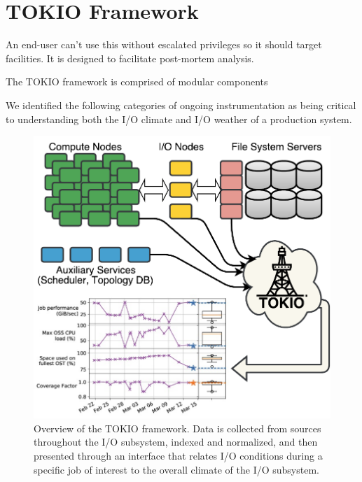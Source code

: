 \section{TOKIO Framework} \label{sec:methods}


An end-user can't use this without escalated privileges so it should target facilities.
It is designed to facilitate post-mortem analysis.

The TOKIO framework is comprised of modular components 

We identified the following categories of ongoing instrumentation as being
critical to understanding both the I/O climate and I/O weather of a
production system.

\begin{figure}[t]
    \centering
    \includegraphics[width=\columnwidth]{figs/tokio-schematic.pdf}
    \caption{Overview of the TOKIO framework.  Data is collected from sources throughout the I/O subsystem, indexed and normalized, and then presented through an interface that relates I/O conditions during a specific job of interest to the overall climate of the I/O subsystem.}
    \label{fig:tokio-schematic}
\end{figure}

